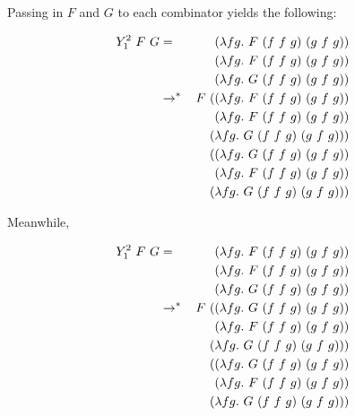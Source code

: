 \documentclass[10pt]{article}
\newcommand{\stepsTo}{\rightarrow}
\newcommand{\multiStepsTo}{\stepsTo^*}
\begin{document}
Passing in $F$ and $G$ to each combinator yields the following:

\begin{eqnarray*}
    Y^2_1~F~G & =             & (\lambda f g .~F~(f~f~g)~(g~f~g)) \\
              &               & (\lambda f g .~F~(f~f~g)~(g~f~g)) \\
              &               & (\lambda f g .~G~(f~f~g)~(g~f~g)) \\
              & \multiStepsTo & F~((\lambda f g .~F~(f~f~g)~(g~f~g)) \\
              &               & \hspace{.45cm}(\lambda f g .~F~(f~f~g)~(g~f~g)) \\
              &               & \hspace{.45cm}(\lambda f g .~G~(f~f~g)~(g~f~g))) \\
              &               & \hspace{.35cm}((\lambda f g .~G~(f~f~g)~(g~f~g)) \\
              &               & \hspace{.45cm}(\lambda f g .~F~(f~f~g)~(g~f~g)) \\
              &               & \hspace{.45cm}(\lambda f g .~G~(f~f~g)~(g~f~g)))
\end{eqnarray*}

Meanwhile,

\begin{eqnarray*}
    Y^2_1~F~G & =             & (\lambda f g .~F~(f~f~g)~(g~f~g)) \\
              &               & (\lambda f g .~F~(f~f~g)~(g~f~g)) \\
              &               & (\lambda f g .~G~(f~f~g)~(g~f~g)) \\
              & \multiStepsTo & F~((\lambda f g .~G~(f~f~g)~(g~f~g)) \\
              &               & \hspace{.45cm}(\lambda f g .~F~(f~f~g)~(g~f~g)) \\
              &               & \hspace{.45cm}(\lambda f g .~G~(f~f~g)~(g~f~g))) \\
              &               & \hspace{.35cm}((\lambda f g .~G~(f~f~g)~(g~f~g)) \\
              &               & \hspace{.45cm}(\lambda f g .~F~(f~f~g)~(g~f~g)) \\
              &               & \hspace{.45cm}(\lambda f g .~G~(f~f~g)~(g~f~g)))
\end{eqnarray*}
\end{document}
